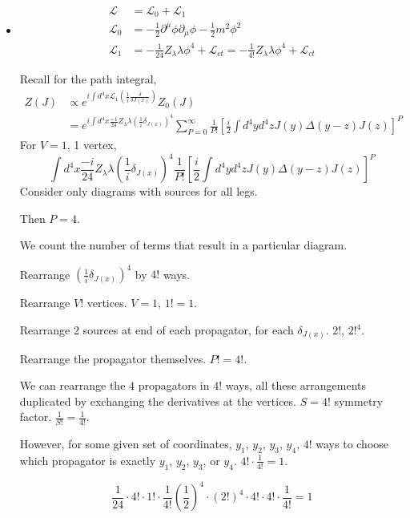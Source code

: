 \documentclass[twoside]{amsart}
\newcommand{\solutionhead}[1]
  {\smallskip
   \noindent{\large\bf Solution #1.}
   }
\begin{document}
\solutionhead{9.2}
\begin{itemize}
\item[(a)] 
\[
\begin{aligned}
  \mathcal{L} & = \mathcal{L}_0 + \mathcal{L}_1 \\
  \mathcal{L}_0 & = - \frac{1}{2} \partial^{\mu}\phi \partial_{\mu} \phi - \frac{1}{2} m^2 \phi^2 \\
 \mathcal{L}_1 & = - \frac{1}{24} Z_{\lambda} \lambda \phi^4 + \mathcal{L}_{ct} = -\frac{1}{4!} Z_{\lambda} \lambda \phi^4 + \mathcal{L}_{ct}
\end{aligned}
\]

Recall for the path integral, 
\[
\begin{aligned}
  Z(J) & \propto e^{ i \int d^4x \mathcal{L}_1\left( \frac{1}{i} \frac{ \delta }{ \delta J(x) } \right)} Z_0(J) \\
  & = e^{ i \int d^4x \frac{-1}{24} Z_{\lambda}\lambda \left( \frac{1}{i} \delta_{J(x)} \right)^4} \sum_{P=0}^{\infty} \frac{1}{P!} \left[ \frac{i}{2} \int d^4y d^4z J(y) \Delta(y-z) J(z) \right]^P
\end{aligned}
\]
For $V=1$, 1 vertex,
\[
\int d^4x \frac{-i}{24} Z_{\lambda} \lambda \left( \frac{1}{i} \delta_{J(x)} \right)^4 \frac{1}{P!} \left[ \frac{i}{2} \int d^4y d^4z J(y) \Delta(y-z) J(z) \right]^P
\]
Consider only diagrams with sources for all legs.  

Then $P=4$.  

We count the number of terms that result in a particular diagram.  

Rearrange $\left( \frac{1}{i} \delta_{J(x)} \right)^4$ by $4!$ ways.  

Rearrange $V!$ vertices.  $V=1$, $1! = 1$.  

Rearrange 2 sources at end of each propagator, for each $\delta_{J(x)}$.  $2!$, $2!^4$.  

Rearrange the propagator themselves.  $P! = 4!$.  

We can rearrange the $4$ propagators in $4!$ ways, all these arrangements duplicated by exchanging the derivatives at the vertices.  $S=4!$ symmetry factor.  $\frac{1}{S!} = \frac{1}{4!}$.  

However, for some given set of coordinates, $y_1$, $y_2$, $y_3$, $y_4$, $4!$ ways to choose which propagator is exactly $y_1$, $y_2$, $y_3$, or $y_4$.  $4! \cdot \frac{1}{4!} = 1$.  

\[
\frac{1}{24} \cdot 4! \cdot 1! \cdot \frac{1}{4!} \left( \frac{1}{2} \right)^4 \cdot (2!)^4 \cdot 4! \cdot 4! \cdot \frac{1}{4!} =1
\]


\end{itemize}
\end{document}
